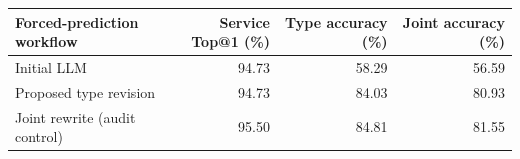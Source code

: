 \begin{tabular*}{\linewidth}{@{\extracolsep{\fill}}lrrr@{}}
\toprule
Forced-prediction workflow & Service Top@1 (\%) & Type accuracy (\%) & Joint accuracy (\%) \\
\midrule
Initial LLM & 94.73 & 58.29 & 56.59 \\
Proposed type revision & 94.73 & 84.03 & 80.93 \\
Joint rewrite (audit control) & 95.50 & 84.81 & 81.55 \\
\bottomrule
\end{tabular*}
